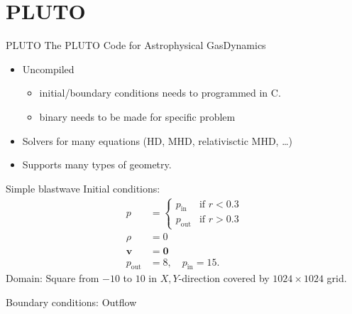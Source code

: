 \documentclass{beamer}
\begin{document}
\section{PLUTO}
\begin{frame}{PLUTO}	
	The PLUTO Code for Astrophysical GasDynamics
	\begin{itemize}
		\item Uncompiled
			\begin{itemize}
				\item initial/boundary conditions needs to programmed in C.
				\item binary needs to be made for specific problem
			\end{itemize} 		
		\item Solvers for many equations (HD, MHD, relativisctic MHD, \ldots)
		\item Supports many types of geometry. 
	\end{itemize}
\end{frame}
\begin{frame}{Simple blastwave}
Initial conditions:
\begin{align*}
	p &= \begin{cases}
		p_\text{in} & \text{if } r < 0.3\\
		p_\text{out} & \text{if } r > 0.3
	\end{cases} \\
	\rho &= 0 \\
	\mathbf v &=  \mathbf 0 \\
	p_\text{out}  &= 8, \quad p_\text{in}  = 15
.\end{align*}
Domain: Square from $-10$ to $10$ in $ X, Y$-direction covered by $1024\times 1024$ grid.

Boundary conditions: Outflow


\end{frame}
\end{document}
